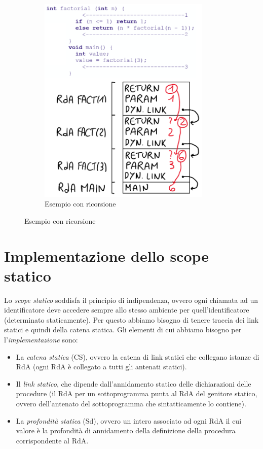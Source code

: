 \documentclass[a4paper,oneside,titlepage]{book}
\begin{document}
\begin{figure}[htp]
\begin{subfigure}{0.49\textwidth}
		\includegraphics[width=0.9\textwidth, height=0.9\textheight, keepaspectratio]{catDin2.png}
		\caption{Esempio con ricorsione}
	\end{subfigure}
\end{figure}

\section{Implementazione dello scope statico}
Lo \textit{scope statico} soddisfa il principio di indipendenza, ovvero ogni chiamata ad un identificatore deve accedere sempre allo stesso ambiente per quell'identificatore (determinato staticamente). Per questo abbiamo bisogno di tenere traccia dei link statici e quindi della catena statica.
\newpage
\noindent
Gli elementi di cui abbiamo bisogno per l'\textit{implementazione} sono:
\begin{itemize}
	\item La \textit{catena statica} (CS), ovvero la catena di link statici che collegano istanze di RdA (ogni RdA è collegato a tutti gli antenati statici).
	\item Il \textit{link statico}, che dipende dall'annidamento statico delle dichiarazioni delle procedure (il RdA per un sottoprogramma punta al RdA del genitore statico, ovvero dell'antenato del sottoprogramma che sintatticamente lo contiene).
	\item La \textit{profondità statica} (Sd), ovvero un intero associato ad ogni RdA il cui valore è la profondità di annidamento della definizione della procedura corrispondente al RdA.		
\end{itemize}
\end{document}
